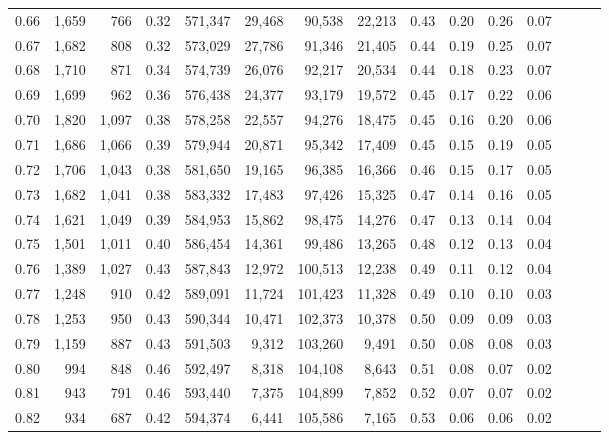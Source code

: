 \begin{tabular}{rrrrrrrrrrrrrrr}
0.66 &   1,659 &    766 &  0.32 &  571,347 &   29,468 &   90,538 &   22,213 &  0.43 &  0.20 &  0.26 &      0.07 \\
0.67 &   1,682 &    808 &  0.32 &  573,029 &   27,786 &   91,346 &   21,405 &  0.44 &  0.19 &  0.25 &      0.07 \\
0.68 &   1,710 &    871 &  0.34 &  574,739 &   26,076 &   92,217 &   20,534 &  0.44 &  0.18 &  0.23 &      0.07 \\
0.69 &   1,699 &    962 &  0.36 &  576,438 &   24,377 &   93,179 &   19,572 &  0.45 &  0.17 &  0.22 &      0.06 \\
0.70 &   1,820 &  1,097 &  0.38 &  578,258 &   22,557 &   94,276 &   18,475 &  0.45 &  0.16 &  0.20 &      0.06 \\
0.71 &   1,686 &  1,066 &  0.39 &  579,944 &   20,871 &   95,342 &   17,409 &  0.45 &  0.15 &  0.19 &      0.05 \\
0.72 &   1,706 &  1,043 &  0.38 &  581,650 &   19,165 &   96,385 &   16,366 &  0.46 &  0.15 &  0.17 &      0.05 \\
0.73 &   1,682 &  1,041 &  0.38 &  583,332 &   17,483 &   97,426 &   15,325 &  0.47 &  0.14 &  0.16 &      0.05 \\
0.74 &   1,621 &  1,049 &  0.39 &  584,953 &   15,862 &   98,475 &   14,276 &  0.47 &  0.13 &  0.14 &      0.04 \\
0.75 &   1,501 &  1,011 &  0.40 &  586,454 &   14,361 &   99,486 &   13,265 &  0.48 &  0.12 &  0.13 &      0.04 \\
0.76 &   1,389 &  1,027 &  0.43 &  587,843 &   12,972 &  100,513 &   12,238 &  0.49 &  0.11 &  0.12 &      0.04 \\
0.77 &   1,248 &    910 &  0.42 &  589,091 &   11,724 &  101,423 &   11,328 &  0.49 &  0.10 &  0.10 &      0.03 \\
0.78 &   1,253 &    950 &  0.43 &  590,344 &   10,471 &  102,373 &   10,378 &  0.50 &  0.09 &  0.09 &      0.03 \\
0.79 &   1,159 &    887 &  0.43 &  591,503 &    9,312 &  103,260 &    9,491 &  0.50 &  0.08 &  0.08 &      0.03 \\
0.80 &     994 &    848 &  0.46 &  592,497 &    8,318 &  104,108 &    8,643 &  0.51 &  0.08 &  0.07 &      0.02 \\
0.81 &     943 &    791 &  0.46 &  593,440 &    7,375 &  104,899 &    7,852 &  0.52 &  0.07 &  0.07 &      0.02 \\
0.82 &     934 &    687 &  0.42 &  594,374 &    6,441 &  105,586 &    7,165 &  0.53 &  0.06 &  0.06 &      0.02 \\

\end{tabular}
